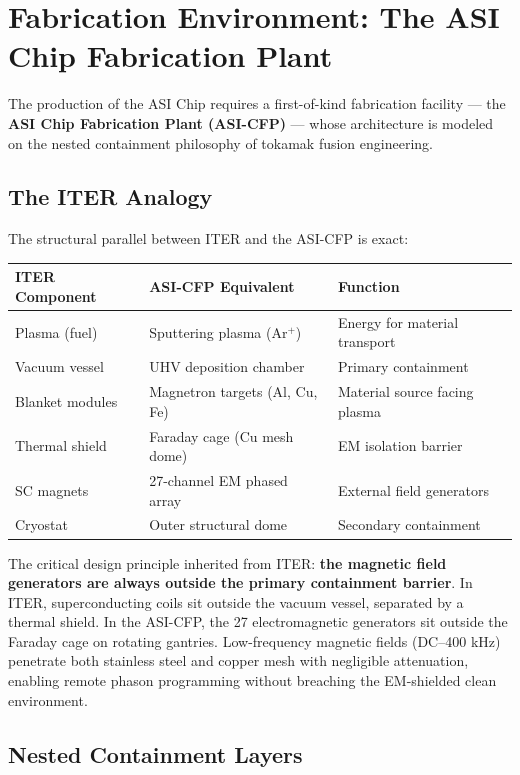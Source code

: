 \section{Fabrication Environment: The ASI Chip Fabrication Plant}

The production of the ASI Chip requires a first-of-kind fabrication facility --- the \textbf{ASI Chip Fabrication Plant (ASI-CFP)} --- whose architecture is modeled on the nested containment philosophy of tokamak fusion engineering.

\subsection{The ITER Analogy}

The structural parallel between ITER and the ASI-CFP is exact:

\begin{center}
\begin{tabular}{lll}
\toprule
\textbf{ITER Component} & \textbf{ASI-CFP Equivalent} & \textbf{Function} \\
\midrule
Plasma (fuel) & Sputtering plasma (Ar$^+$) & Energy for material transport \\
Vacuum vessel & UHV deposition chamber & Primary containment \\
Blanket modules & Magnetron targets (Al, Cu, Fe) & Material source facing plasma \\
Thermal shield & Faraday cage (Cu mesh dome) & EM isolation barrier \\
SC magnets & 27-channel EM phased array & External field generators \\
Cryostat & Outer structural dome & Secondary containment \\
\bottomrule
\end{tabular}
\end{center}

\noindent The critical design principle inherited from ITER: \textbf{the magnetic field generators are always outside the primary containment barrier}. In ITER, superconducting coils sit outside the vacuum vessel, separated by a thermal shield. In the ASI-CFP, the 27 electromagnetic generators sit outside the Faraday cage on rotating gantries. Low-frequency magnetic fields (DC--400 kHz) penetrate both stainless steel and copper mesh with negligible attenuation, enabling remote phason programming without breaching the EM-shielded clean environment.

\subsection{Nested Containment Layers}

